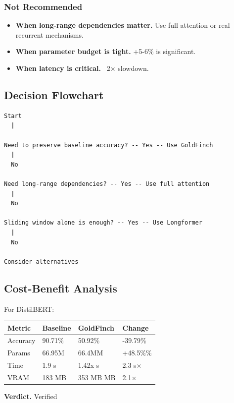 \subsubsection{Not Recommended}

\begin{itemize}
\item \textbf{When long-range dependencies matter.} Use full attention or real
  recurrent mechanisms.
\item \textbf{When parameter budget is tight.} +5-6\% is significant.
\item \textbf{When latency is critical.} ~2$\times$ slowdown.

\end{itemize}
\subsection{Decision Flowchart}

\begin{lstlisting}
Start
  |
   
Need to preserve baseline accuracy? -- Yes -- Use GoldFinch
  |
  No
   
Need long-range dependencies? -- Yes -- Use full attention
  |
  No
   
Sliding window alone is enough? -- Yes -- Use Longformer
  |
  No
   
Consider alternatives
\end{lstlisting}

\subsection{Cost-Benefit Analysis}

For DistilBERT:

\begin{table}[H]
\centering
\small
\begin{tabular}{llll}
\toprule
\textbf{Metric} & \textbf{Baseline} & \textbf{GoldFinch} & \textbf{Change} \\
\midrule
Accuracy & 90.71\% & 50.92\% & -39.79\% \\
Params & 66.95M & 66.4MM & +48.5\%\% \\
Time & 1.9 s & 1.42x s & 2.3 s$\times$ \\
VRAM & 183 MB & 353 MB MB & 2.1$\times$ \\
\bottomrule
\end{tabular}
\end{table}

\textbf{Verdict.} Verified

